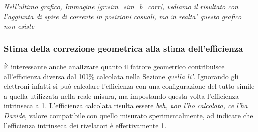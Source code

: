 \textit{Nell'ultimo grafico, Immagine \ref{gr:sim_sim_b_corr}, vediamo il risultato con l'aggiunta di spire di corrente in posizioni casuali, ma in realta' questo grafico non esiste}

\subsubsection{Stima della correzione geometrica alla stima dell'efficienza}
\`E interessante anche analizzare quanto il fattore geometrico contribuisce all'efficienza diversa dal 100\% calcolata nella Sezione \textit{quella li'}. Ignorando gli elettroni infatti si pu\`o calcolare l'efficienza con una configurazione del tutto simile a quella utilizzata nella reale misura, ma impostando questa volta l'efficienza intrinseca a 1. L'efficienza calcolata risulta essere \textit{beh, non l'ho calcolata, ce l'ha Davide}, valore compatibile con quello misurato sperimentalmente, ad indicare che l'efficienza intrinseca dei rivelatori \`e effettivamente 1.
